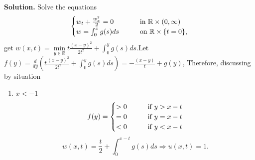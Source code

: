 \documentclass[a4paper]{book}
\newenvironment{solution}%
{\noindent\textbf{Solution.}}%
{\qedhere}
\numberwithin{equation}{chapter}
\theoremstyle{definition}
\begin{document}
\begin{solution}
  Solve the equations
  \begin{align*}
    \begin{cases}
      w_t + \frac{w_x^2}{2} = 0 \qquad& \textmd{in } \mathbb{R} \times (0, \infty) \\
      w = \int_0^x g(s)ds \qquad& \textmd{on } \mathbb{R} \times \{t = 0\},
    \end{cases}
  \end{align*}
  get $w(x, t) = \min\limits_{y \in \mathbb{R}}{t\frac{(x - y)^2}{2t^2} +\int_0^y g(s)ds}$.Let $f(y)= \frac{d}{dy}(t\frac{(x - y)^2}{2t^2} + \int_0^y g(s)ds ) = -\frac{(x - y)}{t} + g(y)$, Therefore, discussing by situation
  \begin{enumerate}
  \item $x < -1$
    \[f(y) =
      \begin{aligned}
      \begin{cases}
        > 0 \qquad &\textmd{if } y > x-t \\
        =0   \qquad &\textmd{if } y = x-t \\
        < 0  \qquad &\textmd{if } y < x-t \\
      \end{cases}
      \end{aligned}
    \]
    \[w(x,t) = \frac{t}{2} + \int_0^{x-t} g(s)ds \Rightarrow u(x,t) = 1 .\]


\end{enumerate}
\end{solution}
\end{document}
